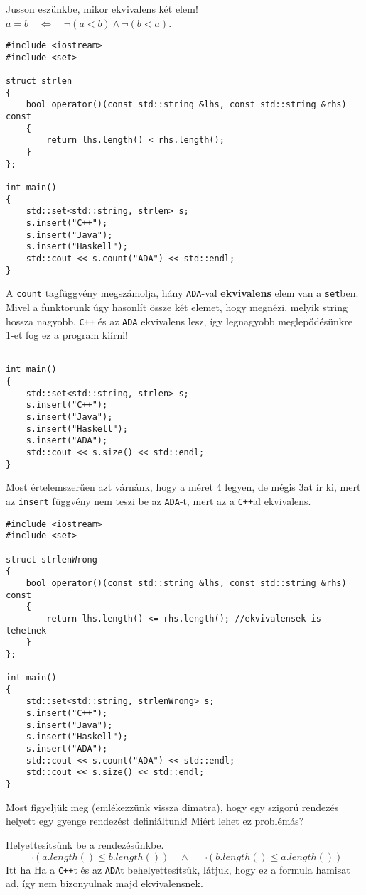 \documentclass[a4paper,11.5pt]{article}
\begin{document}
	\smallskip
	Jusson eszünkbe, mikor ekvivalens két elem! $a = b \quad \Leftrightarrow \quad \neg(a<b) \wedge \neg(b<a)$.
	\begin{lstlisting}
#include <iostream>
#include <set>

struct strlen
{
	bool operator()(const std::string &lhs, const std::string &rhs) const
	{
		return lhs.length() < rhs.length();
	}
};

int main()
{
	std::set<std::string, strlen> s;
	s.insert("C++");
	s.insert("Java");
	s.insert("Haskell");
	std::cout << s.count("ADA") << std::endl;
}
	\end{lstlisting}
	A \texttt{count} tagfüggvény megszámolja, hány \texttt{ADA}-val \textbf{ekvivalens} elem van a \texttt{set}ben. Mivel a funktorunk úgy hasonlít össze két elemet, hogy megnézi, melyik string hossza nagyobb,  \texttt{C++} és az \texttt{ADA} ekvivalens lesz, így legnagyobb meglepődésünkre 1-et fog ez a program kiírni!
\begin{lstlisting}

int main()
{
	std::set<std::string, strlen> s;
	s.insert("C++");
	s.insert("Java");
	s.insert("Haskell");
	s.insert("ADA");
	std::cout << s.size() << std::endl;
}
\end{lstlisting}
	Most értelemszerűen azt várnánk, hogy a méret 4 legyen, de mégis 3at ír ki, mert az \texttt{insert} függvény nem teszi be az \texttt{ADA}-t, mert az a \texttt{C++}al ekvivalens.
\begin{lstlisting}
#include <iostream>
#include <set>

struct strlenWrong
{
	bool operator()(const std::string &lhs, const std::string &rhs) const
	{
		return lhs.length() <= rhs.length(); //ekvivalensek is lehetnek
	}
};

int main()
{
	std::set<std::string, strlenWrong> s;
	s.insert("C++");
	s.insert("Java");
	s.insert("Haskell");
	s.insert("ADA");
	std::cout << s.count("ADA") << std::endl;
	std::cout << s.size() << std::endl;
}
\end{lstlisting}
	Most figyeljük meg (emlékezzünk vissza dimatra), hogy egy szigorú rendezés helyett egy gyenge rendezést definiáltunk! Miért lehet ez problémás?
	
	\smallskip
	Helyettesítsünk be a rendezésünkbe.
	\[ \neg(a.length() \leq b.length())\quad \wedge \quad \neg(b.length() \leq a.length()) \]
	Itt ha Ha a \texttt{C++}t és az \texttt{ADA}t behelyettesítsük, látjuk, hogy ez a formula hamisat ad, így nem bizonyulnak majd ekvivalensnek.
	
\end{document}

